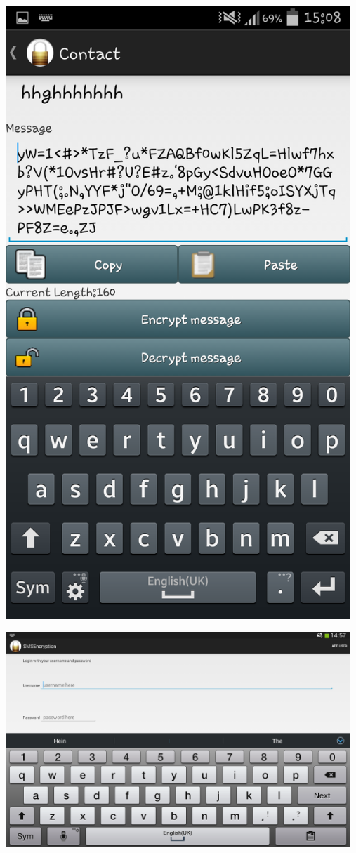 \begin{center}
 \includegraphics[width=13cm]{screenshots/normal/5_ContactPostEncrypt.png}
\end{center}
\begin{center}
 \includegraphics[width=13cm]{screenshots/tablet/1_Login.png}
\end{center}

